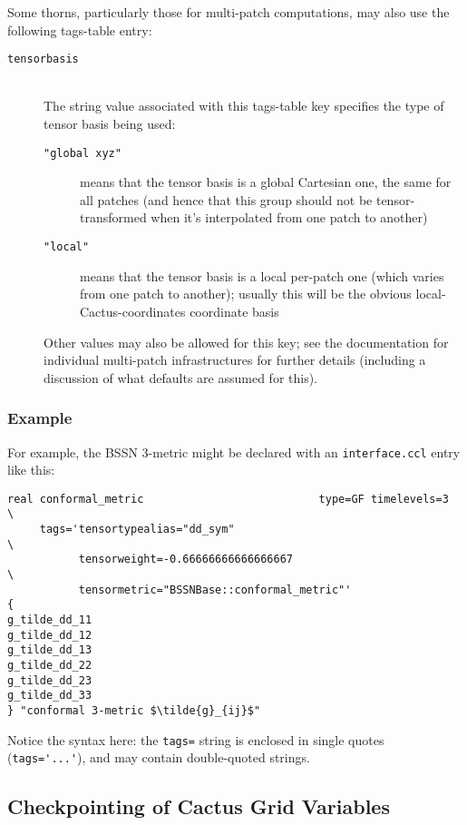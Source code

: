 Some thorns, particularly those for multi-patch computations, may also
use the following tags-table entry:
\begin{description}
\item[\texttt{tensorbasis}]\mbox{}\\
	The string value associated with this tags-table key specifies
	the type of tensor basis being used:
	\begin{description}
	\item[\texttt{"global xyz"}]
		means that the tensor basis is a global Cartesian one,
		the same for all patches (and hence that this group
		should not be tensor-transformed when it's interpolated
		from one patch to another)
	\item[\texttt{"local"}]
		means that the tensor basis is a local per-patch one
		(which varies from one patch to another); usually this
		will be the obvious local-Cactus-coordinates coordinate basis
	\end{description}
	Other values may also be allowed for this key; see the documentation
	for individual multi-patch infrastructures for further details
	(including a discussion of what defaults are assumed for this).
\end{description}


\subsubsection{Example}

For example, the BSSN 3-metric might be declared with an \verb|interface.ccl|
entry like this:
\begin{verbatim}
real conformal_metric                           type=GF timelevels=3    \
     tags='tensortypealias="dd_sym"                                     \
           tensorweight=-0.66666666666666667                            \
           tensormetric="BSSNBase::conformal_metric"'
{
g_tilde_dd_11
g_tilde_dd_12
g_tilde_dd_13
g_tilde_dd_22
g_tilde_dd_23
g_tilde_dd_33
} "conformal 3-metric $\tilde{g}_{ij}$"
\end{verbatim}
Notice the syntax here: the \verb|tags=| string is enclosed in single
quotes (\verb|tags='...'|), and may contain double-quoted strings.


\subsection{Checkpointing of Cactus Grid Variables}

